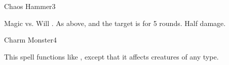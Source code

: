\begin{spellsection}{Chaos Hammer}{3}
\begin{spellheader}
\end{spellheader}
\begin{spellcontent}
    \begin{spelltargetinginfo}
    \end{spelltargetinginfo}
    \begin{spelleffects}
        \begin{spellattack}{Magic vs. Will}
            \spellsuccess {}.
            \spellcritical As above, and the target is \disoriented for 5 rounds.
            \spellfailure Half damage.
        \end{spellattack}
    \end{spelleffects}
\end{spellcontent}
\begin{spellfooter}
\end{spellfooter}
\end{spellsection}

\begin{spellsection}{Charm Monster}{4}
\begin{spellheader}
\end{spellheader}
\begin{spellcontent}
    \begin{spelltargetinginfo}
    \end{spelltargetinginfo}
    \begin{spelleffects}
        \spelleffect This spell functions like , except that it affects creatures of any type.
    \end{spelleffects}
\end{spellcontent}
\begin{spellfooter}
\end{spellfooter}
\end{spellsection}

